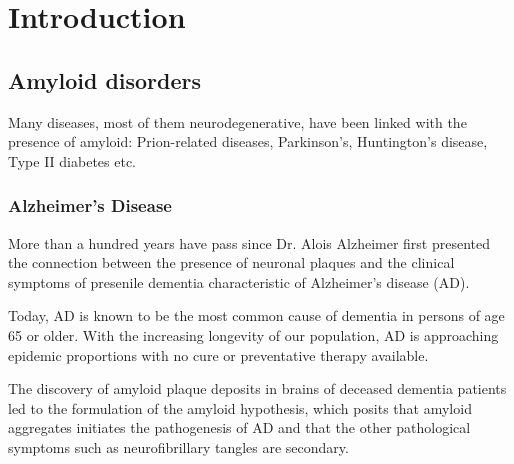 \chapter{Introduction}


\section{Amyloid disorders}
Many diseases, most of them neurodegenerative, have been linked with the presence of amyloid: Prion-related diseases, Parkinson's, Huntington's disease, Type II diabetes etc.

\subsection{Alzheimer's Disease}
\begin{outline}[enumerate]
	\1 More than a hundred years have pass since Dr. Alois Alzheimer first presented the connection between the presence of neuronal plaques and the clinical symptoms of presenile dementia characteristic of Alzheimer's disease (AD).

	\1 Today, AD is known to be the most common cause of dementia in persons of age 65 or older. With the increasing longevity of our population, AD is approaching epidemic proportions with no cure or preventative therapy available.\cite{Blennow:2006wd}

	\1 The discovery of amyloid plaque deposits in brains of deceased dementia patients led to the formulation of the amyloid hypothesis, which posits that amyloid aggregates initiates the pathogenesis of AD and that the other pathological symptoms such as neurofibrillary tangles are secondary.

\end{outline}

